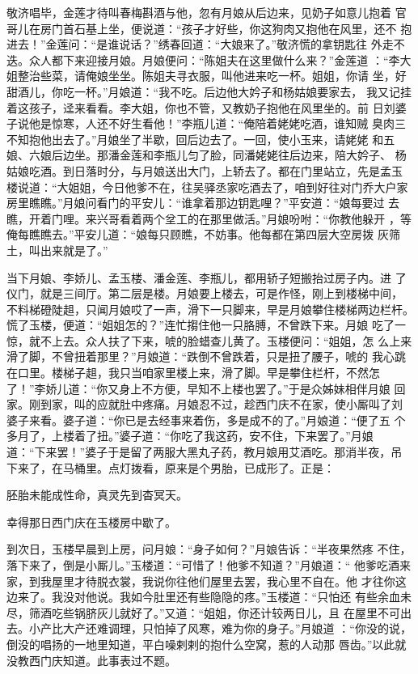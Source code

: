 敬济唱毕，金莲才待叫春梅斟酒与他，忽有月娘从后边来，见奶子如意儿抱着
官哥儿在房门首石基上坐，便说道：“孩子才好些，你这狗肉又抱他在风里，还不
抱进去！”金莲问：“是谁说话？”绣春回道：“大娘来了。”敬济慌的拿钥匙往
外走不迭。众人都下来迎接月娘。月娘便问：“陈姐夫在这里做什么来？”金莲道
：“李大姐整治些菜，请俺娘坐坐。陈姐夫寻衣服，叫他进来吃一杯。姐姐，你请
坐，好甜酒儿，你吃一杯。”月娘道：“我不吃。后边他大妗子和杨姑娘要家去，
我又记挂着这孩子，迳来看看。李大姐，你也不管，又教奶子抱他在风里坐的。前
日刘婆子说他是惊寒，人还不好生看他！”李瓶儿道：“俺陪着姥姥吃酒，谁知贼
臭肉三不知抱他出去了。”月娘坐了半歇，回后边去了。一回，使小玉来，请姥姥
和五娘、六娘后边坐。那潘金莲和李瓶儿匀了脸，同潘姥姥往后边来，陪大妗子、
杨姑娘吃酒。到日落时分，与月娘送出大门，上轿去了。都在门里站立，先是孟玉
楼说道：“大姐姐，今日他爹不在，往吴驿丞家吃酒去了，咱到好往对门乔大户家
房里瞧瞧。”月娘问看门的平安儿：“谁拿着那边钥匙哩？”平安道：“娘每要过
去瞧，开着门哩。来兴哥看着两个坌工的在那里做活。”月娘吩咐：“你教他躲开
，等俺每瞧瞧去。”平安儿道：“娘每只顾瞧，不妨事。他每都在第四层大空房拨
灰筛土，叫出来就是了。”

当下月娘、李娇儿、孟玉楼、潘金莲、李瓶儿，都用轿子短搬抬过房子内。进
了仪门，就是三间厅。第二层是楼。月娘要上楼去，可是作怪，刚上到楼梯中间，
不料梯磴陡趄，只闻月娘哎了一声，滑下一只脚来，早是月娘攀住楼梯两边栏杆。
慌了玉楼，便道：“姐姐怎的？”连忙搊住他一只胳膊，不曾跌下来。月娘
吃了一惊，就不上去。众人扶了下来，唬的脸蜡查儿黄了。玉楼便问：“姐姐，怎
么上来滑了脚，不曾扭着那里？”月娘道：“跌倒不曾跌着，只是扭了腰子，唬的
我心跳在口里。楼梯子趄，我只当咱家里楼上来，滑了脚。早是攀住栏杆，不然怎
了！”李娇儿道：“你又身上不方便，早知不上楼也罢了。”于是众姊妹相伴月娘
回家。刚到家，叫的应就肚中疼痛。月娘忍不过，趁西门庆不在家，使小厮叫了刘
婆子来看。婆子道：“你已是去经事来着伤，多是成不的了。”月娘道：“便了五
个多月了，上楼着了扭。”婆子道：“你吃了我这药，安不住，下来罢了。”月娘
道：“下来罢！”婆子于是留了两服大黑丸子药，教月娘用艾酒吃。那消半夜，吊
下来了，在马桶里。点灯拨看，原来是个男胎，已成形了。正是：

胚胎未能成性命，真灵先到杳冥天。

幸得那日西门庆在玉楼房中歇了。

到次日，玉楼早晨到上房，问月娘：“身子如何？”月娘告诉：“半夜果然疼
不住，落下来了，倒是小厮儿。”玉楼道：“可惜了！他爹不知道？”月娘道：“
他爹吃酒来家，到我屋里才待脱衣裳，我说你往他们屋里去罢，我心里不自在。他
才往你这边来了。我没对他说。我如今肚里还有些隐隐的疼。”玉楼道：“只怕还
有些余血未尽，筛酒吃些锅脐灰儿就好了。”又道：“姐姐，你还计较两日儿，且
在屋里不可出去。小产比大产还难调理，只怕掉了风寒，难为你的身子。”月娘道
：“你没的说，倒没的唱扬的一地里知道，平白噪剌剌的抱什么空窝，惹的人动那
唇齿。”以此就没教西门庆知道。此事表过不题。

